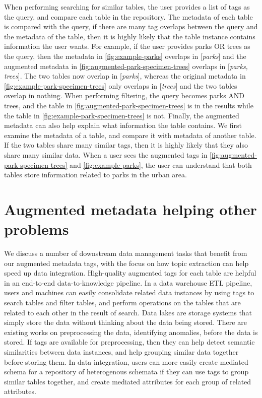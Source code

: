 When performing searching for similar tables, the user provides a list of tags as the query, and compare each table in the repository. The metadata of each table is compared with the query, if there are many tag overlaps between the query and the metadata of the table, then it is highly likely that the table instance contains information the user wants. For example, if the user provides parks OR trees as the query, then the metadata in \autoref{fig:example-parks} overlaps in [\textit{parks}] and the augmented metadata in \autoref{fig:augmented-park-specimen-trees} overlaps in [\textit{parks, trees}]. The two tables now overlap in [\textit{parks}], whereas the original metadata in \autoref{fig:example-park-specimen-trees} only overlaps in [\textit{trees}] and the two tables overlap in nothing. When performing filtering, the query becomes parks AND trees, and the table in \autoref{fig:augmented-park-specimen-trees} is in the results while the table in \autoref{fig:example-park-specimen-trees} is not. Finally, the augmented metadata can also help explain what information the table contains. We first examine the metadata of a table, and compare it with metadata of another table. If the two tables share many similar tags, then it is highly likely that they also share many similar data. When a user sees the augmented tags in \autoref{fig:augmented-park-specimen-trees} and \autoref{fig:example-parks}, the user can understand that both tables store information related to parks in the urban area.

\section{Augmented metadata helping other problems}
\label{sec:AugmentedMetadataHelpingOtherProblems}

We discuss a number of downstream data management tasks that benefit from our augmented metadata tags, with the focus on how topic extraction can help speed up data integration. High-quality augmented tags for each table are helpful in an end-to-end data-to-knowledge pipeline. In a data warehouse ETL pipeline, users and machines can easily consolidate related data instances by using tags to search tables and filter tables, and perform operations on the tables that are related to each other in the result of search. Data lakes are storage systems that simply store the data without thinking about the data being stored. There are existing works on preprocessing the data, identifying anomalies, before the data is stored. If tags are available for preprocessing, then they can help detect semantic similarities between data instances, and help grouping similar data together before storing them. In data integration, users can more easily create mediated schema for a repository of heterogenous schemata if they can use tags to group similar tables together, and create mediated attributes for each group of related attributes.

